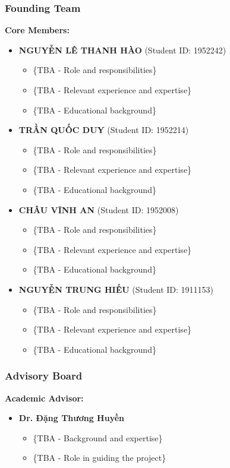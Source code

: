 \subsubsection{Founding Team}
\textbf{Core Members:}
\begin{itemize}
    \item \textbf{NGUYỄN LÊ THANH HÀO} (Student ID: 1952242)
    \begin{itemize}
        \item \{TBA - Role and responsibilities\}
        \item \{TBA - Relevant experience and expertise\}
        \item \{TBA - Educational background\}
    \end{itemize}
    
    \item \textbf{TRẦN QUỐC DUY} (Student ID: 1952214)
    \begin{itemize}
        \item \{TBA - Role and responsibilities\}
        \item \{TBA - Relevant experience and expertise\}
        \item \{TBA - Educational background\}
    \end{itemize}
    
    \item \textbf{CHÂU VĨNH AN} (Student ID: 1952008)
    \begin{itemize}
        \item \{TBA - Role and responsibilities\}
        \item \{TBA - Relevant experience and expertise\}
        \item \{TBA - Educational background\}
    \end{itemize}
    
    \item \textbf{NGUYỄN TRUNG HIẾU} (Student ID: 1911153)
    \begin{itemize}
        \item \{TBA - Role and responsibilities\}
        \item \{TBA - Relevant experience and expertise\}
        \item \{TBA - Educational background\}
    \end{itemize}
\end{itemize}

\subsubsection{Advisory Board}
\textbf{Academic Advisor:}
\begin{itemize}
    \item \textbf{Dr. Đặng Thương Huyền}
    \begin{itemize}
        \item \{TBA - Background and expertise\}
        \item \{TBA - Role in guiding the project\}
    \end{itemize}
\end{itemize}

